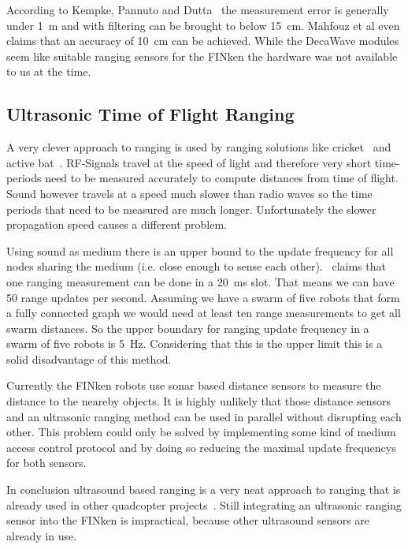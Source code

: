 According to Kempke, Pannuto and Dutta~\cite{uwb_localisation_copter} the measurement error is generally under \SI{1}{\metre} and with filtering can be brought to below \SI{15}{\centi\metre}.
Mahfouz et al\cite{uwb_decawave} even claims that an accuracy of \SI{10}{\centi\metre} can be achieved.
While the DecaWave modules seem like suitable ranging sensors for the FINken the hardware was not available to us at the time.

\subsection{Ultrasonic Time of Flight Ranging}
A very clever approach to ranging is used by ranging solutions like cricket~\cite{cricket_01} and active bat~\cite{active_bat}. 
RF-Signals travel at the speed of light and therefore very short time-periods need to be measured accurately to compute distances from time of flight.
Sound however travels at a speed much slower than radio waves so the time periods that need to be measured are much longer.
Unfortunately the slower propagation speed causes a different problem.

Using sound as medium there is an upper bound to the update frequency for all nodes sharing the medium (i.e. close enough to sense each other).~\cite{active_bat} claims that one ranging measurement can be done in a \SI{20}{\milli\second} slot.
That means we can have 50 range updates per second.
Assuming we have a swarm of five robots that form a fully connected graph we would need at least ten range measurements to get all swarm distances.
So the upper boundary for ranging update frequency in a swarm of five robots is \SI{5}{\hertz}.
Considering that this is the upper limit this is a solid disadvantage of this method. 

Currently the FINken robots use sonar based distance sensors to measure the distance to the neareby objects.
It is highly unlikely that those distance sensors and an ultrasonic ranging method can be used in parallel without disrupting each other.
This problem could only be solved by implementing some kind of medium access control protocol and by doing so reducing the maximal update frequencys for both sensors.


In conclusion ultrasound based ranging is a very neat approach to ranging that is already used in other quadcopter projects~\cite{ultrasonic_erlangen}.
Still integrating an ultrasonic ranging sensor into the FINken is impractical, because other ultrasound sensors are already in use.


